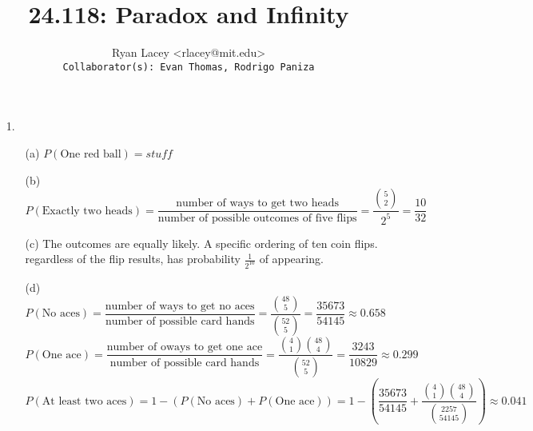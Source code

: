 \documentclass{article}
\begin{document}

\title{24.118: Paradox and Infinity}
\author{
  Ryan Lacey <rlacey@mit.edu>\\
  \footnotesize \texttt{Collaborator(s): Evan Thomas, Rodrigo Paniza}
}
        
\maketitle
        


\begin{enumerate}
\item[1.]
	\begin{enumerate}
	\item[(a)] 
			$P(\text{One red ball}) = stuff$
	\item[(b)] 
			$P(\text{Exactly two heads}) = \dfrac{\text{number of ways to get two heads}}{\text{number of possible outcomes of five flips}} = \dfrac{\binom{5}{2}}{2^5} = \dfrac{10}{32}$
	\item[(c)] 
			The outcomes are equally likely. A specific ordering of ten coin flips. regardless of the flip results, has probability $\frac{1}{2^{10}}$ of appearing.
	\item[(d)] 
			$P(\text{No aces})= \dfrac{\text{number of ways to get no aces}}{\text{number of possible card hands}} = \dfrac{\binom{48}{5}}{\binom{52}{5}} = \dfrac{35673}{54145} \approx 0.658$\\
			
			$P(\text{One ace})= \dfrac{\text{number of oways to get one ace}}{\text{number of possible card hands}} = \dfrac{\binom{4}{1}\binom{48}{4}}{\binom{52}{5}} = \dfrac{3243}{10829} \approx 0.299$\\
			
			$P(\text{At least two aces})= 1 - \left(P(\text{No aces}) + P(\text{One ace})\right) = 1 - \left(\dfrac{35673}{54145} + \dfrac{\binom{4}{1}\binom{48}{4}}{\binom{2257}{54145}} \right) \approx 0.041$
	\end{enumerate}


\bigskip


\end{enumerate}
\end{document}
